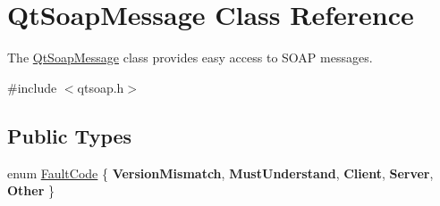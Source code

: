 \hypertarget{class_qt_soap_message}{}\section{Qt\+Soap\+Message Class Reference}
\label{class_qt_soap_message}


The \mbox{\hyperlink{class_qt_soap_message}{Qt\+Soap\+Message}} class provides easy access to S\+O\+AP messages.  




{\ttfamily \#include $<$qtsoap.\+h$>$}

\subsection*{Public Types}
\begin{DoxyCompactItemize}
\item 
enum \mbox{\hyperlink{class_qt_soap_message_ad27765646a4612b1f644229e9544b744}{Fault\+Code}} \{ \newline
{\bfseries Version\+Mismatch}, 
{\bfseries Must\+Understand}, 
{\bfseries Client}, 
{\bfseries Server}, 
\newline
{\bfseries Other}
 \}
\end{DoxyCompactItemize}
